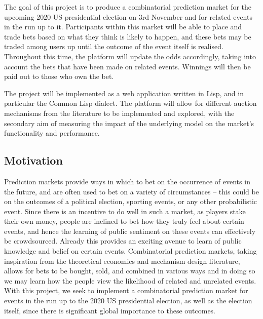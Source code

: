 \documentclass[10pt,a4paper]{article}
\theoremstyle{plain}
\theoremstyle{definition}
\begin{document}
	The goal of this project is to produce a combinatorial prediction market
	for the upcoming 2020 US presidential election on 3rd November and for
	related events in the run up to it. Participants within this market will be
	able to place and trade bets based on what they think is likely to happen,
	and these bets may be traded among users up until the outcome of the event itself is
	realised. Throughout this time, the platform will update the odds
	accordingly, taking into account the bets that have been made on related
	events. Winnings will then be paid out to those who own the bet.

	The project will be implemented as a web application written in Lisp, and
	in particular the Common Lisp dialect. The platform will allow for
	different auction mechanisms from the literature to be implemented and
	explored, with the secondary aim of measuring the impact of the underlying
	model on the market's functionality and performance.

	\subsection{Motivation}

	Prediction markets provide ways in which to bet on the occurrence of events
	in the future, and are often used to bet on a variety of circumstances --
	this could be on the outcomes of a political election, sporting events, or
	any other probabilistic event. Since there is an incentive to do well in
	such a market, as players stake their own money, people are inclined to bet
	how they truly feel about certain events, and hence the learning of public
	sentiment on these events can effectively be crowdsourced. Already this
	provides an exciting avenue to learn of public knowledge and belief on
	certain events. Combinatorial prediction markets, taking inspiration from
	the theoretical economics and mechanism design literature, allows for bets
	to be bought, sold, and combined in various ways and in doing so we may
	learn how the people view the likelihood of related and unrelated events.
	With this project, we seek to implement a combinatorial prediction market
	for events in the run up to the 2020 US presidential election, as well as
	the election itself, since there is significant global importance to these
	outcomes.
\end{document}
